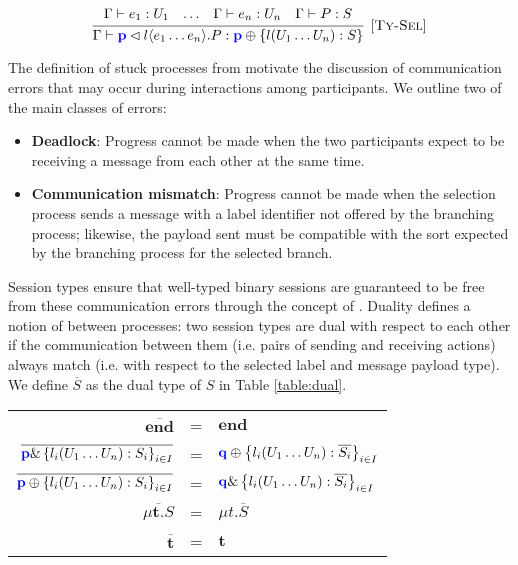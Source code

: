 \[
\infer[\mbox{\rulename{Ty-Sel}}]{
	\Gamma \vdash \sel{\parti{p}}{l}{e_1 \dots e_n}.P : \tysel{\parti{p}}{l(U_1 \dots U_n): S}
	}{
	\begin{array}{cccc}
	\Gamma \vdash e_1 : U_1
	&
	\dots
	&
	\Gamma \vdash e_n : U_n
	&
    \Gamma \vdash P : S
	\end{array}
}
\]

The definition of stuck processes from \mathref{\ref{section_async}} motivate the discussion of communication errors that may occur during interactions among participants. We outline two of the main classes of errors:

\begin{itemize}
\item \textbf{Deadlock}: Progress cannot be made when the two participants expect to be receiving a message from each other at the same time.
\item \textbf{Communication mismatch}: Progress cannot be made when the selection process sends a message with a label identifier not offered by the branching process; likewise, the payload sent must be compatible with the sort expected by the branching process for the selected branch.
\end{itemize}

Session types ensure that well-typed binary sessions are guaranteed to be free from these communication errors through the concept of . Duality defines a notion of  between processes: two session types are dual with respect to each other if the communication between them (i.e. pairs of sending and receiving actions) always match (i.e. with respect to the selected label and message payload type). We define $\overline{S}$ as the dual type of $S$ in Table \ref{table:dual}.

\renewcommand{\arraystretch}{1.2}
\begin{center}
\begin{tabular}{rcl}
$\overline{\mathbf{end}}$ & = & $\mathbf{end}$ \\
$\overline{{\color{blue}\mathbf{p}} \& \left\{l_i(U_1 \dots U_n):S_i\right\}_{i\in I}}$ & = & ${\color{blue}\mathbf{q}} \oplus \left\{l_i(U_1 \dots U_n):\overline{S_i}\right\}_{i\in I}$ \\
$\overline{{\color{blue}\mathbf{p}} \oplus \left\{l_i(U_1 \dots U_n):S_i\right\}_{i\in I}}$ & = & ${\color{blue}\mathbf{q}} \& \left\{l_i(U_1 \dots U_n):\overline{S_i}\right\}_{i\in I}$ \\
$\overline{\mu \mathbf{t}. S}$ & = & $\mu t. \overline{S}$ \\
$\overline{\mathbf{t}}$ & = & $\mathbf{t}$ \\ 
\end{tabular}
\label{table:dual}
\end{center}
\renewcommand{\arraystretch}{1}


